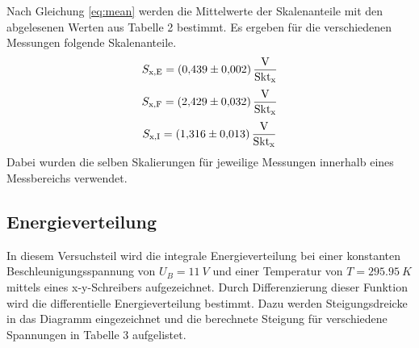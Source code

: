 Nach Gleichung \ref{eq:mean} werden die Mittelwerte der Skalenanteile mit den abgelesenen Werten aus Tabelle 2 bestimmt.
Es ergeben für die verschiedenen Messungen folgende Skalenanteile.
\begin{equation}
  S_\text{x,E} = \SI{0.439 \pm 0.002}{\frac{V}{Skt_x}} \notag
\end{equation}
\begin{equation}
  S_\text{x,F} = \SI{2.429 \pm 0.032}{\frac{V}{Skt_x}} \notag
\end{equation}
\begin{equation}
  S_\text{x,I} = \SI{1.316 \pm 0.013}{\frac{V}{Skt_x}} \notag
\end{equation}
Dabei wurden die selben Skalierungen für jeweilige Messungen innerhalb eines Messbereichs verwendet.

\subsection{Energieverteilung}
In diesem Versuchsteil wird die integrale Energieverteilung bei einer konstanten Beschleunigungsspannung von $U_B = \SI{11}{V}$ und einer Temperatur von $T = \SI{295.95}{K}$ mittels eines x-y-Schreibers aufgezeichnet.
Durch Differenzierung dieser Funktion wird die differentielle Energieverteilung bestimmt.
Dazu werden Steigungsdreicke in das Diagramm eingezeichnet und die berechnete Steigung für verschiedene Spannungen in Tabelle 3 aufgelistet.

